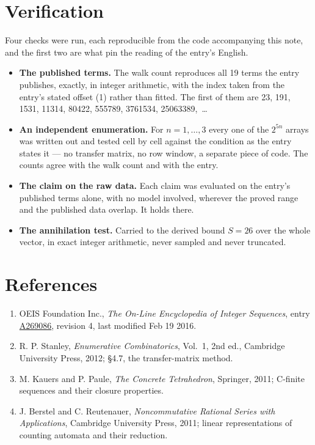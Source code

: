 \documentclass[11pt]{article}
\theoremstyle{definition}
\begin{document}
\section{Verification}

Four checks were run, each reproducible from the code accompanying this note, and the first two are what pin the reading of the entry's English.

\begin{itemize}

\item {\bfseries The published terms.} The walk count reproduces all 19 terms the entry publishes, exactly, in integer arithmetic, with the index taken from the entry's stated offset (1) rather than fitted. The first of them are 23, 191, 1531, 11314, 80422, 555789, 3761534, 25063389,~\dots

\item {\bfseries An independent enumeration.} For $n = 1,\dots,3$ every one of the $2^{5n}$ arrays was written out and tested cell by cell against the condition as the entry states it --- no transfer matrix, no row window, a separate piece of code. The counts agree with the walk count and with the entry.

\item {\bfseries The claim on the raw data.} Each claim was evaluated on the entry's published terms alone, with no model involved, wherever the proved range and the published data overlap. It holds there.

\item {\bfseries The annihilation test.} Carried to the derived bound $S = 26$ over the whole vector, in exact integer arithmetic, never sampled and never truncated.

\end{itemize}

\section{References}

\begin{enumerate}

\item OEIS Foundation Inc., \emph{The On-Line Encyclopedia of Integer Sequences}, entry \href{https://oeis.org/A269086}{A269086}, revision 4, last modified Feb 19 2016.

\item R. P. Stanley, \emph{Enumerative Combinatorics}, Vol.~1, 2nd ed., Cambridge University Press, 2012; \S4.7, the transfer-matrix method.

\item M. Kauers and P. Paule, \emph{The Concrete Tetrahedron}, Springer, 2011; C-finite sequences and their closure properties.

\item J. Berstel and C. Reutenauer, \emph{Noncommutative Rational Series with Applications}, Cambridge University Press, 2011; linear representations of counting automata and their reduction.

\end{enumerate}
\end{document}
